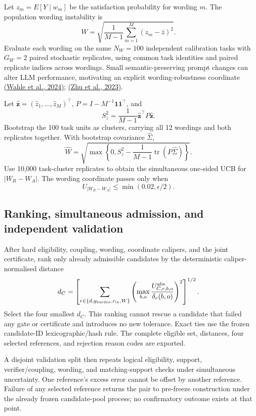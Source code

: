 \documentclass[11pt,a4paper]{article}
\begin{document}
Let $z_m=E[Y\mid w_m]$ be the satisfaction probability for wording $m$. The population wording instability is
\[
W=\sqrt{\frac{1}{M-1}\sum_{m=1}^M(z_m-\bar z)^2}.
\]
Evaluate each wording on the same $N_W=100$ independent calibration tasks with $G_W=2$ paired stochastic replicates, using common task identities and paired replicate indices across wordings. Small semantic-preserving prompt changes can alter LLM performance, motivating an explicit wording-robustness coordinate \href{https://arxiv.org/abs/2406.19898}{(Wahle et al., 2024)}; \href{https://arxiv.org/abs/2306.04528}{(Zhu et al., 2023)}.

Let $\widehat{\mathbf z}=(\hat z_1,\ldots,\hat z_M)^\top$, $P=I-M^{-1}\mathbf1\mathbf1^\top$, and
\[
S_z^2=\frac{1}{M-1}\widehat{\mathbf z}^{\top}P\widehat{\mathbf z}.
\]
Bootstrap the 100 task units as clusters, carrying all 12 wordings and both replicates together. With bootstrap covariance $\widehat\Sigma$,
\[
\widehat W=\sqrt{\max\left\{0,S_z^2-\frac{1}{M-1}\operatorname{tr}(P\widehat\Sigma)\right\}}.
\]
Use 10,000 task-cluster replicates to obtain the simultaneous one-sided UCB for $|W_R-W_A|$. The wording coordinate passes only when
\[
\boxed{U_{|W_R-W_A|}\le\min(0.02,\epsilon/2).}
\]

\subsection{Ranking, simultaneous admission, and independent validation}
After hard eligibility, coupling, wording, coordinate calipers, and the joint certificate, rank only already admissible candidates by the deterministic caliper-normalised distance
\[
d_C=\left[\sum_{r\in\{d,g_{\rm burden},r_{\rm in},W\}}
\left(\max_{b,o}\frac{U^{\rm abs}_{C,r,b,o}}{\delta_r(b,o)}\right)^2\right]^{1/2}.
\]
Select the four smallest $d_C$. This ranking cannot rescue a candidate that failed any gate or certificate and introduces no new tolerance. Exact ties use the frozen candidate-ID lexicographic/hash rule. The complete eligible set, distances, four selected references, and rejection reason codes are exported.

A disjoint validation split then repeats logical eligibility, support, verifier/coupling, wording, and matching-support checks under simultaneous uncertainty. One reference's excess error cannot be offset by another reference. Failure of any selected reference returns the pair to pre-freeze construction under the already frozen candidate-pool process; no confirmatory outcome exists at that point.
\end{document}

